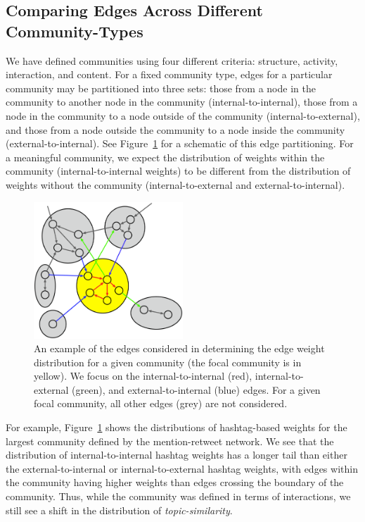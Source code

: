 \subsection{Comparing Edges Across Different Community-Types}

We have defined communities using four different criteria: structure, activity, interaction, and content. For a fixed community type, edges for a particular community may be partitioned into three sets: those from a node in the community to another node in the community (internal-to-internal), those from a node in the community to a node outside of the community (internal-to-external), and those from a node outside the community to a node inside the community (external-to-internal). See Figure~\ref{Fig-edge_types} for a schematic of this edge partitioning. For a meaningful community, we expect the distribution of weights within the community (internal-to-internal weights) to be different from the distribution of weights without the community (internal-to-external and external-to-internal).

\begin{figure}[ht]
  \centering
\includegraphics[width=0.50\textwidth]{figures/edge-types.eps}
\caption{An example of the edges considered in determining the edge weight distribution for a given community (the focal community is in yellow). We focus on the internal-to-internal (red), internal-to-external (green), and external-to-internal (blue) edges. For a given focal community, all other edges (grey) are not considered.}
\label{Fig-edge_types}
\end{figure}

For example, Figure~\ref{Fig-edge_types} shows the distributions of hashtag-based weights for the largest community defined by the mention-retweet network. We see that the distribution of internal-to-internal hashtag weights has a longer tail than either the external-to-internal or internal-to-external hashtag weights, with edges within the community having higher weights than edges crossing the boundary of the community. Thus, while the community was defined in terms of interactions, we still see a shift in the distribution of \emph{topic-similarity}.

